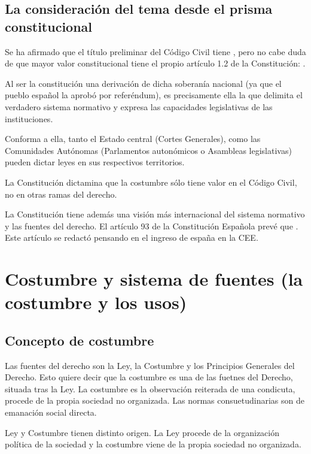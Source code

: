 \documentclass[a4paper,12pt]{report}
\begin{document}
\subsection{La consideración del tema desde el prisma constitucional}

Se ha afirmado que el título preliminar del Código Civil tiene , pero no cabe duda de que mayor valor constitucional tiene el propio artículo 1.2 de la Constitución: .

Al ser la constitución una derivación de dicha soberanía nacional (ya que el pueblo español la aprobó por referéndum), es precisamente ella la que delimita el verdadero sistema normativo y expresa las capacidades legislativas de las instituciones.

Conforma a ella, tanto el Estado central (Cortes Generales), como las Comunidades Autónomas (Parlamentos autonómicos o Asambleas legislativas) pueden dictar leyes en sus respectivos territorios.

La Constitución dictamina que la costumbre sólo tiene valor en el Código Civil, no en otras ramas del derecho.

La Constitución tiene además una visión más internacional del sistema normativo y las fuentes del derecho. El artículo 93 de la Constitución Española prevé que . Este artículo se redactó pensando en el ingreso de españa en la CEE.

\section{Costumbre y sistema de fuentes (la costumbre y los usos)}
\subsection{Concepto de costumbre}

Las fuentes del derecho son la Ley, la Costumbre y los Principios Generales del Derecho. Esto quiere decir que la costumbre es una de las fuetnes del Derecho, situada tras la Ley. La costumbre es la observación reiterada de una condicuta, procede de la propia sociedad no organizada. Las normas consuetudinarias son de emanación social directa.

Ley y Costumbre tienen distinto origen. La Ley procede de la organización política de la sociedad y la costumbre viene de la propia sociedad no organizada.
\end{document}
